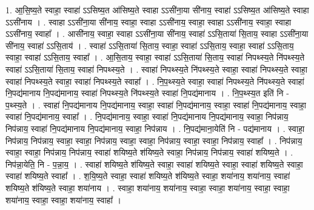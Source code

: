 \documentclass[17pt]{extarticle}
\begin{document}
1. आ॒सि॒ष्य॒ते स्वाहा॒ स्वाहा॑ ऽऽसिष्य॒त आ॑सिष्य॒ते स्वाहा ऽऽसी॑ना॒या सी॑नाय॒ स्वाहा॑ ऽऽसिष्य॒त आ॑सिष्य॒ते स्वाहा ऽऽसी॑नाय । . स्वाहा ऽऽसी॑ना॒या सी॑नाय॒ स्वाहा॒ स्वाहा ऽऽसी॑नाय॒ स्वाहा॒ स्वाहा ऽऽसी॑नाय॒ स्वाहा॒ स्वाहा ऽऽसी॑नाय॒ स्वाहा᳚ । . आसी॑नाय॒ स्वाहा॒ स्वाहा ऽऽसी॑ना॒या सी॑नाय॒ स्वाहा॑ ऽऽसि॒ताया॑ सि॒ताय॒ स्वाहा ऽऽसी॑ना॒या सी॑नाय॒ स्वाहा॑ ऽऽसि॒ताय॑ । . स्वाहा॑ ऽऽसि॒ताया॑ सि॒ताय॒ स्वाहा॒ स्वाहा॑ ऽऽसि॒ताय॒ स्वाहा॒ स्वाहा॑ ऽऽसि॒ताय॒ स्वाहा॒ स्वाहा॑ ऽऽसि॒ताय॒ स्वाहा᳚ । . आ॒सि॒ताय॒ स्वाहा॒ स्वाहा॑ ऽऽसि॒ताया॑ सि॒ताय॒ स्वाहा॑ निपथ्स्य॒ते नि॑पथ्स्य॒ते स्वाहा॑ ऽऽसि॒ताया॑ सि॒ताय॒ स्वाहा॑ निपथ्स्य॒ते । . स्वाहा॑ निपथ्स्य॒ते नि॑पथ्स्य॒ते स्वाहा॒ स्वाहा॑ निपथ्स्य॒ते स्वाहा॒ स्वाहा॑ निपथ्स्य॒ते स्वाहा॒ स्वाहा॑ निपथ्स्य॒ते स्वाहा᳚ । . नि॒प॒थ्स्य॒ते स्वाहा॒ स्वाहा॑ निपथ्स्य॒ते नि॑पथ्स्य॒ते स्वाहा॑ नि॒पद्य॑मानाय नि॒पद्य॑मानाय॒ स्वाहा॑ निपथ्स्य॒ते नि॑पथ्स्य॒ते स्वाहा॑ नि॒पद्य॑मानाय । . नि॒प॒थ्स्य॒त इति॑ नि - प॒थ्स्य॒ते । . स्वाहा॑ नि॒पद्य॑मानाय नि॒पद्य॑मानाय॒ स्वाहा॒ स्वाहा॑ नि॒पद्य॑मानाय॒ स्वाहा॒ स्वाहा॑ नि॒पद्य॑मानाय॒ स्वाहा॒ स्वाहा॑ नि॒पद्य॑मानाय॒ स्वाहा᳚ । . नि॒पद्य॑मानाय॒ स्वाहा॒ स्वाहा॑ नि॒पद्य॑मानाय नि॒पद्य॑मानाय॒ स्वाहा॒ निप॑न्नाय॒ निप॑न्नाय॒ स्वाहा॑ नि॒पद्य॑मानाय नि॒पद्य॑मानाय॒ स्वाहा॒ निप॑न्नाय । . नि॒पद्य॑माना॒येति॑ नि - पद्य॑मानाय । . स्वाहा॒ निप॑न्नाय॒ निप॑न्नाय॒ स्वाहा॒ स्वाहा॒ निप॑न्नाय॒ स्वाहा॒ स्वाहा॒ निप॑न्नाय॒ स्वाहा॒ स्वाहा॒ निप॑न्नाय॒ स्वाहा᳚ । . निप॑न्नाय॒ स्वाहा॒ स्वाहा॒ निप॑न्नाय॒ निप॑न्नाय॒ स्वाहा॑ शयिष्य॒ते श॑यिष्य॒ते स्वाहा॒ निप॑न्नाय॒ निप॑न्नाय॒ स्वाहा॑ शयिष्य॒ते । . निप॑न्ना॒येति॒ नि - प॒न्ना॒य॒ । . स्वाहा॑ शयिष्य॒ते श॑यिष्य॒ते स्वाहा॒ स्वाहा॑ शयिष्य॒ते स्वाहा॒ स्वाहा॑ शयिष्य॒ते स्वाहा॒ स्वाहा॑ शयिष्य॒ते स्वाहा᳚ । . श॒यि॒ष्य॒ते स्वाहा॒ स्वाहा॑ शयिष्य॒ते श॑यिष्य॒ते स्वाहा॒ शया॑नाय॒ शया॑नाय॒ स्वाहा॑ शयिष्य॒ते श॑यिष्य॒ते स्वाहा॒ शया॑नाय । . स्वाहा॒ शया॑नाय॒ शया॑नाय॒ स्वाहा॒ स्वाहा॒ शया॑नाय॒ स्वाहा॒ स्वाहा॒ शया॑नाय॒ स्वाहा॒ स्वाहा॒ शया॑नाय॒ स्वाहा᳚ । \newline
\end{document}
